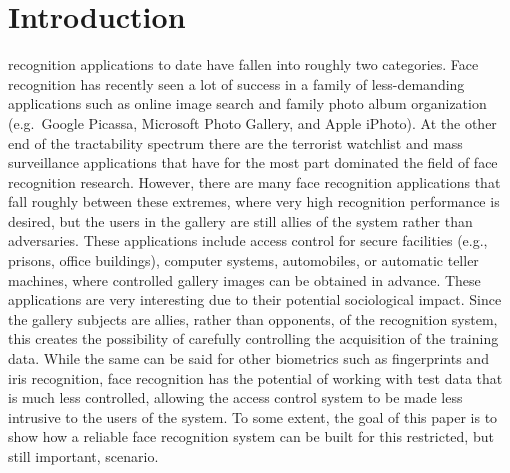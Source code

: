 \documentclass[10pt,journal,letterpaper,compsoc]{IEEEtran}
\begin{document}
\maketitle

\IEEEdisplaynotcompsoctitleabstractindextext
\vspace{-9mm} 

\IEEEpeerreviewmaketitle

\section{Introduction}

 recognition applications to date have fallen
into roughly two categories.  Face recognition has recently
seen a lot of success in a family of less-demanding
applications such as online image search and family photo album
organization (e.g.\ Google Picassa, Microsoft Photo Gallery,
and Apple iPhoto). At the other end of the tractability
spectrum there are the terrorist watchlist and mass
surveillance applications that have for the most part dominated
the field of face recognition research.  However, there are
many face recognition applications that fall roughly between
these extremes, where very high recognition performance is
desired, but the users in the gallery are still allies of the
system rather than adversaries.  These applications include
access control for secure facilities (e.g., prisons, office
buildings), computer systems, automobiles, or automatic teller
machines, where controlled gallery images can be obtained in
advance.  These applications are very interesting due to their
potential sociological impact.  Since the gallery subjects are
allies, rather than opponents, of the recognition system, this
creates the possibility of carefully controlling the
acquisition of the training data. While the same can be said
for other biometrics such as fingerprints and iris recognition,
face recognition has the potential of working with test data
that is much less controlled, allowing the access control
system to be made less intrusive to the users of the system. To
some extent, the goal of this paper is to show how a reliable
face recognition system can be built for this restricted, but
still important, scenario.
\end{document}
